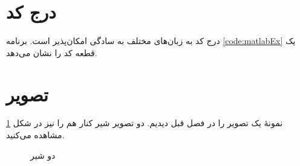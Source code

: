 \section{درج کد}
درج کد به زبان‌های مختلف به سادگی امکان‌پذیر است. برنامه
\ref{code:matlabEx}
یک قطعه کد
را نشان می‌دهد.
\singlespacing
\begin{figure}
	\begin{LTR}
		
	\end{LTR}
\end{figure}
\doublespacing

\section{تصویر}
نمونهٔ یک تصویر را در فصل قبل دیدیم. دو تصویر شیر کنار هم را نیز در شکل
\ref{fig:twoLion}
مشاهده می‌کنید.
\begin{figure}[ht]
\centering 
{}
\caption{دو شیر}
\label{fig:twoLion} %
\end{figure}

